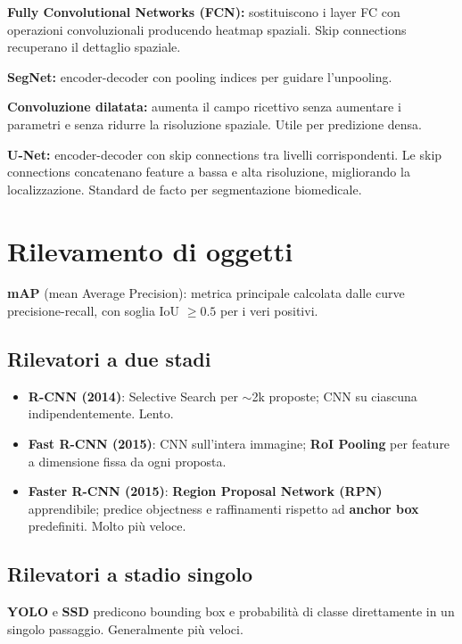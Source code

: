 \documentclass[12pt, a4paper]{report}
\begin{document}
\textbf{Fully Convolutional Networks (FCN):} sostituiscono i layer FC con
operazioni convoluzionali producendo heatmap spaziali. Skip connections recuperano
il dettaglio spaziale.

\textbf{SegNet:} encoder-decoder con pooling indices per guidare l'unpooling.

\textbf{Convoluzione dilatata:} aumenta il campo ricettivo senza aumentare i
parametri e senza ridurre la risoluzione spaziale. Utile per predizione densa.

\textbf{U-Net:} encoder-decoder con skip connections tra livelli corrispondenti.
Le skip connections concatenano feature a bassa e alta risoluzione, migliorando
la localizzazione. Standard de facto per segmentazione biomedicale.

\section{Rilevamento di oggetti}

\textbf{mAP} (mean Average Precision): metrica principale calcolata dalle curve
precisione-recall, con soglia IoU $\geq0.5$ per i veri positivi.

\subsection{Rilevatori a due stadi}

\begin{itemize}
  \item \textbf{R-CNN (2014)}: Selective Search per $\sim$2k proposte; CNN su
        ciascuna indipendentemente. Lento.
  \item \textbf{Fast R-CNN (2015)}: CNN sull'intera immagine; \textbf{RoI Pooling}
        per feature a dimensione fissa da ogni proposta.
  \item \textbf{Faster R-CNN (2015)}: \textbf{Region Proposal Network (RPN)}
        apprendibile; predice objectness e raffinamenti rispetto ad
        \textbf{anchor box} predefiniti. Molto più veloce.
\end{itemize}

\subsection{Rilevatori a stadio singolo}

\textbf{YOLO} e \textbf{SSD} predicono bounding box e probabilità di classe
direttamente in un singolo passaggio. Generalmente più veloci.
\end{document}
